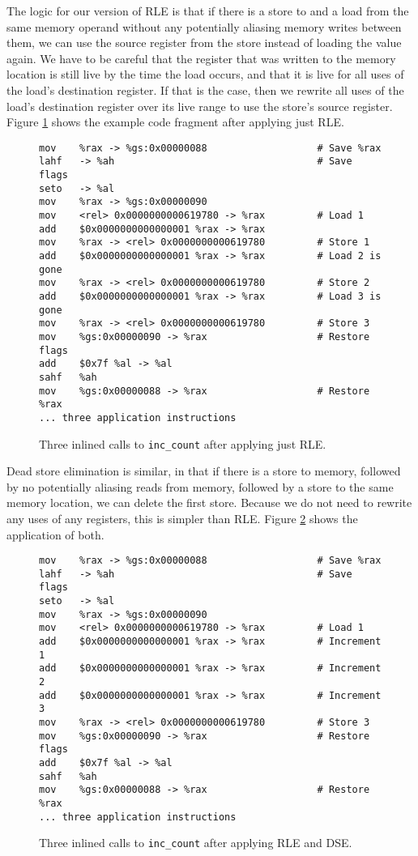 The logic for our version of RLE is that if there is a store to and a load from
the same memory operand without any potentially aliasing memory writes between
them, we can use the source register from the store instead of loading the value
again.  We have to be careful that the register that was written to the memory
location is still live by the time the load occurs, and that it is live for all
uses of the load's destination register.  If that is the case, then we rewrite
all uses of the load's destination register over its live range to use the
store's source register.  Figure \ref{fig:inscount_rle} shows the example code
fragment after applying just RLE.

\begin{figure}
\begin{verbatim}
mov    %rax -> %gs:0x00000088                   # Save %rax
lahf   -> %ah                                   # Save flags
seto   -> %al 
mov    %rax -> %gs:0x00000090 
mov    <rel> 0x0000000000619780 -> %rax         # Load 1
add    $0x0000000000000001 %rax -> %rax 
mov    %rax -> <rel> 0x0000000000619780         # Store 1
add    $0x0000000000000001 %rax -> %rax         # Load 2 is gone
mov    %rax -> <rel> 0x0000000000619780         # Store 2
add    $0x0000000000000001 %rax -> %rax         # Load 3 is gone
mov    %rax -> <rel> 0x0000000000619780         # Store 3
mov    %gs:0x00000090 -> %rax                   # Restore flags
add    $0x7f %al -> %al 
sahf   %ah 
mov    %gs:0x00000088 -> %rax                   # Restore %rax
... three application instructions
\end{verbatim}
\caption{Three inlined calls to {\tt inc\_count} after applying just RLE.}
\label{fig:inscount_rle}
\end{figure}

Dead store elimination is similar, in that if there is a store to memory,
followed by no potentially aliasing reads from memory, followed by a store to
the same memory location, we can delete the first store.  Because we do not need
to rewrite any uses of any registers, this is simpler than RLE.  Figure
\ref{fig:inscount_rle_dse} shows the application of both.

\begin{figure}
\begin{verbatim}
mov    %rax -> %gs:0x00000088                   # Save %rax
lahf   -> %ah                                   # Save flags
seto   -> %al 
mov    %rax -> %gs:0x00000090 
mov    <rel> 0x0000000000619780 -> %rax         # Load 1
add    $0x0000000000000001 %rax -> %rax         # Increment 1
add    $0x0000000000000001 %rax -> %rax         # Increment 2
add    $0x0000000000000001 %rax -> %rax         # Increment 3
mov    %rax -> <rel> 0x0000000000619780         # Store 3
mov    %gs:0x00000090 -> %rax                   # Restore flags
add    $0x7f %al -> %al 
sahf   %ah 
mov    %gs:0x00000088 -> %rax                   # Restore %rax
... three application instructions
\end{verbatim}
\caption{Three inlined calls to {\tt inc\_count} after applying RLE and DSE.}
\label{fig:inscount_rle_dse}
\end{figure}

